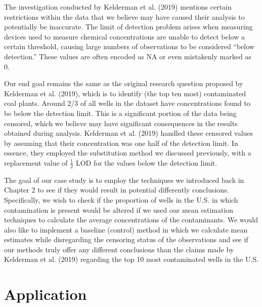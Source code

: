 \documentclass[12pt, twoside]{amherstthesis}
\begin{document}
The investigation conducted by Kelderman et al. (2019) mentions certain restrictions within the data that we believe may have caused their analysis to potentially be inaccurate. The limit of detection problem arises when measuring devices used to measure chemical concentrations are unable to detect below a certain threshold, causing large numbers of observations to be considered ``below detection.'' These values are often encoded as NA or even mistakenly marked as 0.

Our end goal remains the same as the original research question proposed by Kelderman et al. (2019), which is to identify (the top ten most) contaminated coal plants. Around 2/3 of all wells in the dataset have concentrations found to be below the detection limit. This is a significant portion of the data being censored, which we believe may have significant consequences in the results obtained during analysis. Kelderman et al. (2019) handled these censored values by assuming that their concentration was one half of the detection limit. In essence, they employed the substitution method we discussed previously, with a replacement value of \(\frac{1}{2}\) LOD for the values below the detection limit.

The goal of our case study is to employ the techniques we introduced back in Chapter 2 to see if they would result in potential differently conclusions. Specifically, we wish to check if the proportion of wells in the U.S. in which contamination is present would be altered if we used our mean estimation techniques to calculate the average concentrations of the contaminants. We would also like to implement a baseline (control) method in which we calculate mean estimates while disregarding the censoring status of the observations and see if our methods truly offer any different conclusions than the claims made by Kelderman et al. (2019) regarding the top 10 most contaminated wells in the U.S.

\hypertarget{application}{%
\section{Application}\label{application}}
\end{document}
